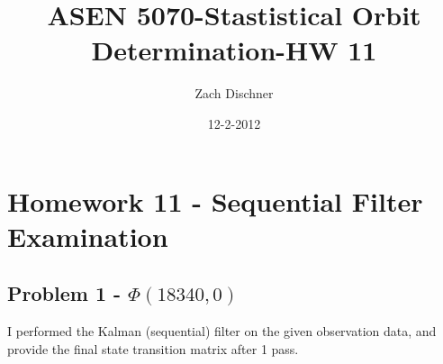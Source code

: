 \documentclass[]{article}
\begin{document}
\title{ASEN 5070-Stastistical Orbit Determination-HW 11}
\author{Zach Dischner}
\date{12-2-2012}
\maketitle


\section{Homework 11 - Sequential Filter Examination}
\subsection{ Problem 1 - $\Phi(18340,0)$ }
I performed the Kalman (sequential) filter on the given observation data, and provide the final state transition matrix after 1 pass. 
\end{document}
